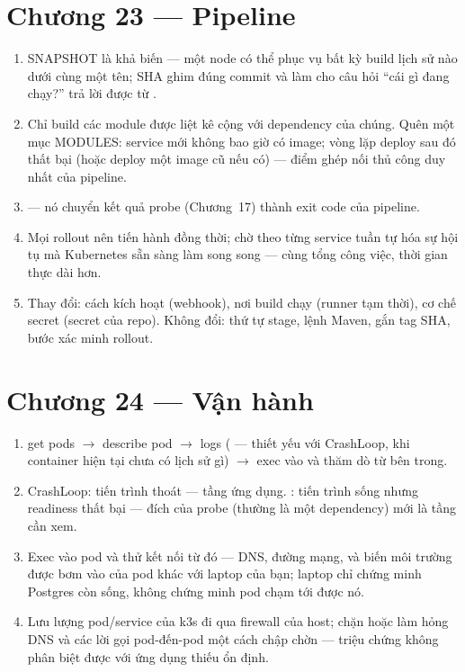 \section*{Chương 23 --- Pipeline}
\begin{enumerate}
  \item SNAPSHOT là khả biến --- một node có thể phục vụ bất kỳ build
  lịch sử nào dưới cùng một tên; SHA ghim đúng commit và làm cho câu
  hỏi ``cái gì đang chạy?'' trả lời được từ .
  \item Chỉ build các module được liệt kê cộng với dependency của
  chúng. Quên một mục MODULES: service mới không bao giờ có image;
  vòng lặp deploy sau đó thất bại (hoặc deploy một image cũ nếu có)
  --- điểm ghép nối thủ công duy nhất của pipeline.
  \item {} --- nó chuyển kết
  quả probe (Chương~17) thành exit code của pipeline.
  \item Mọi rollout nên tiến hành đồng thời; chờ theo từng service
  tuần tự hóa sự hội tụ mà Kubernetes sẵn sàng làm song song --- cùng
  tổng công việc, thời gian thực dài hơn.
  \item Thay đổi: cách kích hoạt (webhook), nơi build chạy (runner tạm
  thời), cơ chế secret (secret của repo). Không đổi: thứ tự stage, lệnh
  Maven, gắn tag SHA, bước xác minh rollout.
\end{enumerate}

\section*{Chương 24 --- Vận hành}
\begin{enumerate}
  \item get pods $\rightarrow$ describe pod $\rightarrow$ logs
  ( --- thiết yếu với CrashLoop, khi container hiện
  tại chưa có lịch sử gì) $\rightarrow$ exec vào và thăm dò từ bên
  trong.
  \item CrashLoop: tiến trình thoát --- tầng ứng dụng.
  : tiến trình sống nhưng readiness thất bại ---
  đích của probe (thường là một dependency) mới là tầng cần xem.
  \item Exec vào pod và thử kết nối từ đó --- DNS, đường mạng, và biến
  môi trường được bơm vào của pod khác với laptop của bạn; laptop chỉ
  chứng minh Postgres còn sống, không chứng minh pod chạm tới được nó.
  \item Lưu lượng pod/service của k3s đi qua firewall của host; chặn
   hoặc  làm hỏng DNS và các
  lời gọi pod-đến-pod một cách chập chờn --- triệu chứng không phân
  biệt được với ứng dụng thiếu ổn định.
\end{enumerate}

